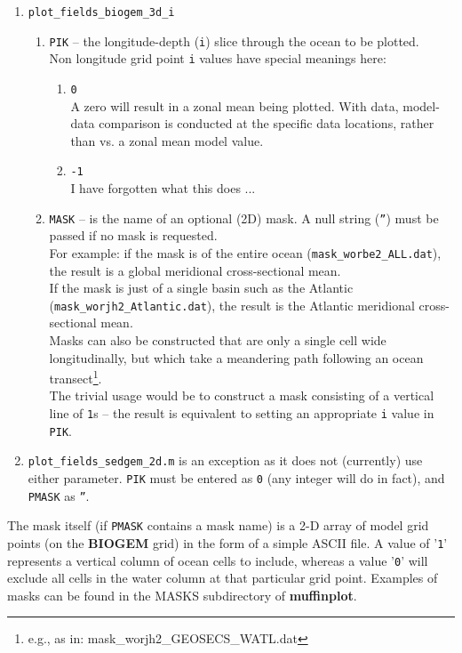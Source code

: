 \documentclass[11pt,fleqn]{book} %
\begin{document}
\begin{enumerate}
\vspace{2pt}
\item \texttt{plot\_fields\_biogem\_3d\_i}
\begin{enumerate}
\item \texttt{PIK} -- the longitude-depth (\texttt{i}) slice through the ocean to be plotted.
\\Non longitude grid point \texttt{i} values have special meanings here:
\begin{enumerate}[noitemsep]
\item \texttt{0}
\\A zero will result in a zonal mean being plotted. With data, model-data comparison is conducted at the specific data locations, rather than vs. a zonal mean model value.
\item \texttt{-1}
\\I have forgotten what this does ...
\end{enumerate}
\item \texttt{MASK} -- is the name of an optional (2D) mask. A null string (\texttt{''}) must be passed if no mask is requested.
\\ For example: if the mask is of the entire ocean (\texttt{mask\_worbe2\_ALL.dat}), the result is a global meridional cross-sectional mean.
\\ If the mask is just of a single basin such as the Atlantic (\texttt{mask\_worjh2\_Atlantic.dat}), the result is the Atlantic meridional cross-sectional mean.
\\ Masks can also be constructed that are only a single cell wide longitudinally, but which take a meandering path following an ocean transect\footnote{e.g., as in: \textsf{mask\_worjh2\_GEOSECS\_WATL.dat}}.
\\ The trivial usage would be to construct a mask consisting of a vertical line of \texttt{1}s -- the result is equivalent to setting an appropriate \texttt{i} value in \texttt{PIK}.
\end{enumerate}

\vspace{2pt}
\item \texttt{plot\_fields\_sedgem\_2d.m} is an exception as it does not (currently) use either parameter. \texttt{PIK} must be entered as \texttt{0} (any integer will do in fact), and \texttt{PMASK} as \texttt{''}.

\end{enumerate}
\vspace{4pt}

The mask itself (if \texttt{PMASK} contains a mask name) is a 2-D array of model grid points (on the \textbf{BIOGEM} grid) in the form of a simple ASCII file. A value of '\texttt{1}' represents a vertical column of ocean cells to include, whereas a value '\texttt{0}' will exclude all cells in the water column at that particular grid point. Examples of masks can be found in the \footnotesize\textsf{MASKS }\normalsize subdirectory of \textbf{muffinplot}.
        
\end{document}

